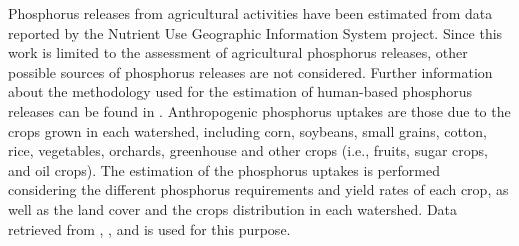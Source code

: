 \documentclass[authoryear]{elsarticle}
\begin{document}
Phosphorus releases from agricultural activities have been estimated from data reported by the Nutrient Use Geographic Information System
project. Since this work is limited to the assessment of agricultural phosphorus releases, other possible sources of phosphorus releases are not considered. Further information about the methodology used for the estimation of human-based phosphorus releases can be found in \citet{NuGIS}. 
Anthropogenic phosphorus uptakes are those due to the crops grown in each watershed, including corn, soybeans, small grains, cotton, rice, vegetables, orchards, greenhouse and other crops (i.e., fruits, sugar crops, and oil crops). The estimation of the phosphorus uptakes is performed considering the different phosphorus requirements and yield rates of each crop, as well as the land cover and the crops distribution in each watershed. Data retrieved from \citet{2017CensusofAgriculture}, \citet{USDAHandbook}, and \citet{EnviroAtlas} is used for this purpose.
\end{document}
